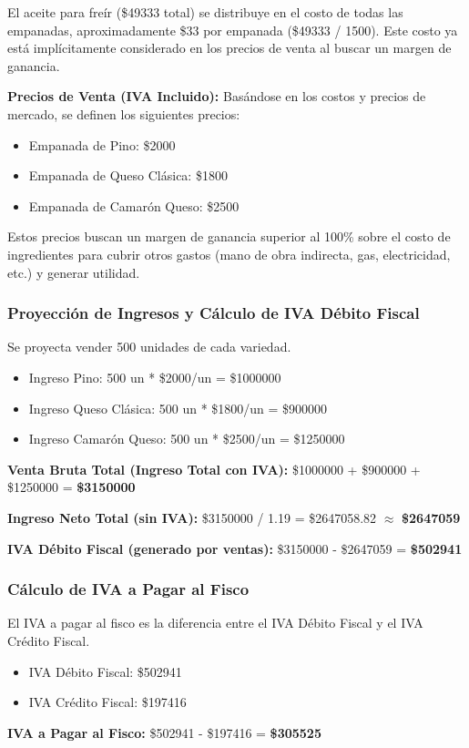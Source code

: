\documentclass[12pt]{article}
\begin{document}
El aceite para freír (\$\num{49333} total) se distribuye en el costo de todas las empanadas, aproximadamente \$\num{33} por empanada (\$\num{49333} / 1500). Este costo ya está implícitamente considerado en los precios de venta al buscar un margen de ganancia.

\textbf{Precios de Venta (IVA Incluido):}
Basándose en los costos y precios de mercado, se definen los siguientes precios:
\begin{itemize}
    \item Empanada de Pino: \$\num{2000}
    \item Empanada de Queso Clásica: \$\num{1800}
    \item Empanada de Camarón Queso: \$\num{2500}
\end{itemize}
Estos precios buscan un margen de ganancia superior al 100\% sobre el costo de ingredientes para cubrir otros gastos (mano de obra indirecta, gas, electricidad, etc.) y generar utilidad.

\subsubsection{Proyección de Ingresos y Cálculo de IVA Débito Fiscal}
Se proyecta vender 500 unidades de cada variedad.
\begin{itemize}
    \item Ingreso Pino: 500 un * \$\num{2000}/un = \$\num{1000000}
    \item Ingreso Queso Clásica: 500 un * \$\num{1800}/un = \$\num{900000}
    \item Ingreso Camarón Queso: 500 un * \$\num{2500}/un = \$\num{1250000}
\end{itemize}
\textbf{Venta Bruta Total (Ingreso Total con IVA):} \$\num{1000000} + \$\num{900000} + \$\num{1250000} = \textbf{\$\num{3150000}}

\textbf{Ingreso Neto Total (sin IVA):} \$\num{3150000} / 1.19 = \$\num{2647058.82} $\approx$ \textbf{\$\num{2647059}}

\textbf{IVA Débito Fiscal (generado por ventas):} \$\num{3150000} - \$\num{2647059} = \textbf{\$\num{502941}}

\subsubsection{Cálculo de IVA a Pagar al Fisco}
El IVA a pagar al fisco es la diferencia entre el IVA Débito Fiscal y el IVA Crédito Fiscal.
\begin{itemize}
    \item IVA Débito Fiscal: \$\num{502941}
    \item IVA Crédito Fiscal: \$\num{197416}
\end{itemize}
\textbf{IVA a Pagar al Fisco:} \$\num{502941} - \$\num{197416} = \textbf{\$\num{305525}}
\end{document}
